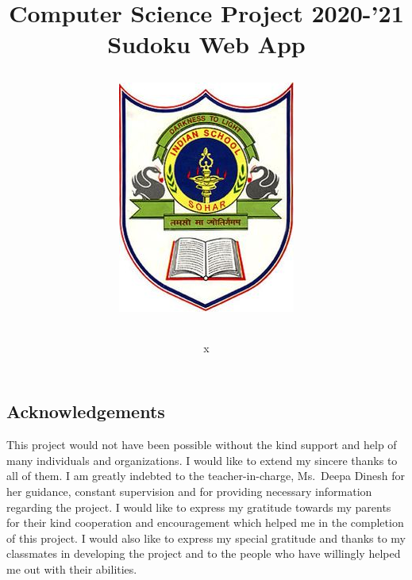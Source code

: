 \documentclass[12pt, a4paper]{report}
\title{
    \begin{huge}
    \textbf{
      {Computer Science Project 2020-'21}\\
      {Sudoku Web App}
    }\\
    \end{huge}
  \begin{figure}
      \centering
      {\includegraphics[scale=2]{iss}}
  \end{figure}
}
\author{
x %
}
\date{\vspace{-5ex}}
\begin{document}
  \begin{titlepage}
  \maketitle
  \end{titlepage}

  \newpage
  
  
  \newpage
  \maketitle
  \begin{large}
  \section*{Acknowledgements}
  This project would not have been possible without the kind support and help of many individuals and organizations. I would like to extend my sincere thanks to all of them. \newline
  \newline
  I am greatly indebted to the teacher-in-charge, Ms.~Deepa Dinesh for her guidance, constant supervision and for providing necessary information 
  regarding the project. \newline
  \newline
  I would like to express my gratitude towards my parents for their kind cooperation and encouragement which helped me in the completion of this project. \newline
  \newline
  I would also like to express my special gratitude and thanks to my classmates in developing the project and to the people who have willingly 
  helped me out with their abilities.
  \end{large}
  
  
  \maketitle    %
  \begin{large}
  \newpage
  \tableofcontents
  \end{large}
  
  
  \newpage
\end{document}
